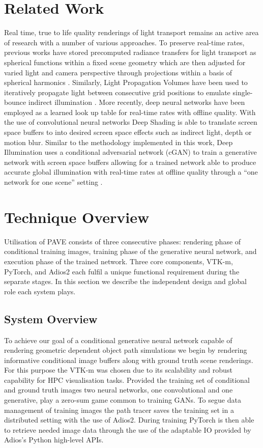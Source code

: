 \documentclass[conference]{IEEEtran}
\begin{document}
\section{Related Work}

Real time, true to life quality renderings of light transport remains an active area of research with a number of various approaches. To preserve real-time rates, previous works have stored precomputed radiance transfers for light transport as spherical functions within a fixed scene geometry which are then adjusted for varied light and camera perspective through projections within a basis of spherical harmonics \cite{sloanPrecompRad}. Similarly, Light Propagation Volumes have been used to iteratively propagate light between consecutive grid positions to emulate single-bounce indirect illumination \cite{kaplanyanCasac}. More recently, deep neural  networks have been employed as a learned look up table for real-time rates with offline quality. With the use of convolutional neural networks Deep Shading is able to translate screen space buffers to into desired screen space effects such as indirect light, depth or motion blur. Similar to the methodology implemented in this work, Deep Illumination uses a conditional adversarial network (cGAN) to train a generative network with screen space buffers allowing for a trained network able to produce accurate global illumination with real-time rates at offline quality through a ``one network for one scene'' setting  \cite{deepillum}.

\section{Technique Overview}

Utilisation of PAVE consists of three consecutive phases: rendering phase of conditional training images, training phase of the generative neural network, and execution phase of the trained network. Three core components, VTK-m, PyTorch, and Adios2 each fulfil a unique functional requirement during the separate stages. In this section we describe the independent design and global role each system plays.

\subsection{System Overview}
 
To achieve our goal of a conditional generative neural network capable of rendering geometric dependent object path simulations we begin by rendering informative conditional image buffers along with ground truth scene renderings. For this purpose the VTK-m was chosen due to its scalability and robust capability for HPC visualisation tasks. Provided the training set of conditional and ground truth images two neural networks, one convolutional and one generative, play a zero-sum game common to training GANs. To segue data management of training images the path tracer saves the training set in a distributed setting with the use of Adios2. During training PyTorch is then able to retrieve needed image data through the use of the adaptable IO provided by Adios's Python high-level APIs.
\end{document}
